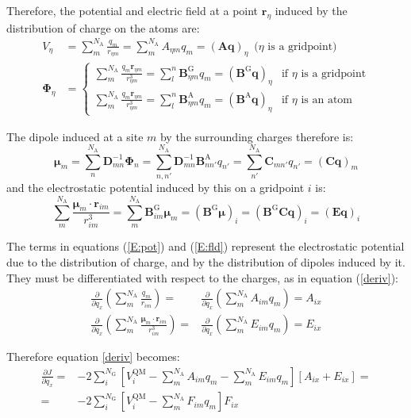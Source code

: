 \documentclass[a4paper]{report}
\newcommand{\bs}{\boldsymbol}
\newcommand{\NAA}[0]{{N_\mathrm{A}}}
\newcommand{\NGG}[0]{{N_\mathrm{G}}}
\begin{document}
Therefore, the potential and electric field at a point $\bs{r}_\eta$ induced by the distribution of charge on the atoms are:
\begin{align}
  \label{E:pot}
  V_\eta &= \sum_m^{N_\mathrm{A}} \frac{q_m}{r_{\eta m}} = \sum_m^{N_\mathrm{A}} A_{\eta m} q_m = (\bs{A}\bs{q})_\eta \,\,\,\text{($\eta$ is a gridpoint)} \\
  \bs{\Phi}_\eta  &=\left\{ \begin{array}{ll} \sum_m^\NAA \frac{q_m \bs{r}_{\eta m}}{r_{\eta m}^3} = \sum_l^n \bs{B}^\mathrm{G}_{\eta m} q_m = (\bs{B}^\mathrm{G}\bs{q})_\eta & \text{if $\eta$ is a gridpoint} \\
  \sum_m^\NAA \frac{q_m \bs{r}_{\eta m}}{r_{\eta m}^3} = \sum_l^n \bs{B}^\mathrm{A}_{\eta m} q_m = (\bs{B}^\mathrm{A}\bs{q})_\eta & \text{if $\eta$ is an atom} \end{array} \right.
\end{align}

The dipole induced at a site $m$ by the surrounding charges therefore is:
\begin{equation}
\bs{\mu}_m = \sum_n^\NAA \bs{D}^{-1}_{mn} \bs{\Phi}_n = \sum_{n,n'}^\NAA 
\bs{D}^{-1}_{mn} \bs{B}^\mathrm{A}_{nn'} q_{n'} = \sum_{n'}^\NAA \bs{C}_{mn'} q_{n'} = (\bs{C}\bs{q})_m 
\end{equation}
and the electrostatic potential induced by this on a gridpoint $i$ is:
\begin{equation}
\label{E:fld}
\sum_m^\NAA \frac{\bs{\mu}_m \cdot \bs{r}_{im}}{r_{im}^3} = \sum_m^\NAA \bs{B}^\mathrm{G}_{im} \bs{\mu}_m = (\bs{B}^\mathrm{G} \bs{\mu})_i = (\bs{B}^\mathrm{G} \bs{C} \bs{q})_i = (\bs{E} \bs{q})_i
\end{equation}

The terms in equations (\ref{E:pot}) and (\ref{E:fld}) represent the electrostatic potential due to the distribution of charge, and by the distribution of dipoles induced by it. They must be differentiated with respect to the charges, as in equation (\ref{deriv}):
\begin{align}
\frac{\partial}{\partial q_x} \left(\sum_m^\NAA \frac{q_m}{r_{im}}\right) =&
\frac{\partial}{\partial q_x} \left(\sum_m^\NAA A_{im} q_m\right) = A_{ix} \\
\frac{\partial}{\partial q_x} \left(\sum_m^\NAA \frac{\bs{\mu}_m \cdot
\bs{r}_{im}}{r_{im}^3} \right) =& 
\frac{\partial}{\partial q_x} \left(\sum_m^\NAA E_{im} q_m \right) = E_{ix}
\end{align}

Therefore equation \ref{deriv} becomes:
\begin{align}
\frac{\partial J}{\partial q_x} =& - 2 \sum_i^\NGG \left[ V_i^\mathrm{QM} - \sum_m^\NAA A_{im} q_m - \sum_m^\NAA E_{im} q_m \right] \left[ A_{ix} + E_{ix} \right] = \nonumber \\
\label{E:A}
=& -2\sum_i^\NGG \left[ V^\mathrm{QM}_i - \sum_m^\NAA F_{im} q_m\right] F_{ix}
\end{align}
\end{document}
